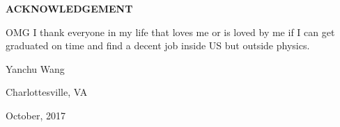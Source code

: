 \begin{center}
\textbf{\huge ACKNOWLEDGEMENT}
\end{center}
\vspace{0.5cm}

OMG I thank everyone in my life that loves me or is loved by me if I can get graduated on time and find a decent job inside US but outside physics.

\vspace{0.5cm}
\begin{flushleft}
Yanchu Wang

Charlottesville, VA

October, 2017
\end{flushleft}
